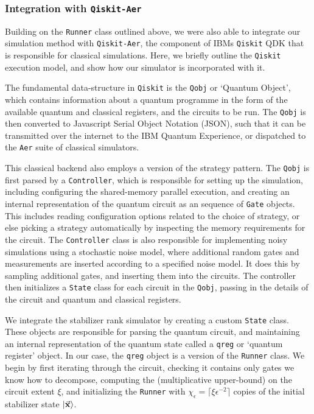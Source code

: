 \subsubsection{Integration with \texttt{Qiskit-Aer}}
Building on the \texttt{Runner} class outlined above, we were also able to integrate our simulation method with \texttt{Qiskit-Aer}, the component of IBMs \texttt{Qiskit} QDK that is responsible for classical simulations. Here, we briefly outline the \texttt{Qiskit} execution model, and show how our simulator is incorporated with it.\par
The fundamental data-structure in \texttt{Qiskit} is the \texttt{Qobj} or `Quantum Object', which contains information about a quantum programme in the form of the available quantum and classical registers, and the circuits to be run. The \texttt{Qobj} is then converted to Javascript Serial Object Notation (JSON), such that it can be transmitted over the internet to the IBM Quantum Experience, or dispatched to the \texttt{Aer} suite of classical simulators.\par 
This classical backend also employs a version of the strategy pattern. The \texttt{Qobj} is first parsed by a \texttt{Controller}, which is responsible for setting up the simulation, including configuring the shared-memory parallel execution, and creating an internal representation of the quantum circuit as an sequence of \texttt{Gate} objects. This includes reading configuration options related to the choice of strategy, or else picking a strategy automatically by inspecting the memory requirements for the circuit. The \texttt{Controller} class is also responsible for implementing noisy simulations using a stochastic noise model, where additional random gates and measurements are inserted according to a specified noise model. It does this by sampling additional gates, and inserting them into the circuits. The controller then initializes a \texttt{State} class for each circuit in the \texttt{Qobj}, passing in the details of the circuit and quantum and classical registers. \par
We integrate the stabilizer rank simulator by creating a custom \texttt{State} class. These objects are responsible for parsing the quantum circuit, and maintaining an internal representation of the quantum state called a \texttt{qreg} or `quantum register' object. In our case, the \texttt{qreg} object is a version of the \texttt{Runner} class. We begin by first iterating through the circuit, checking it contains only gates we know how to decompose, computing the (multiplicative upper-bound) on the circuit extent $\xi$, and initializing the \texttt{Runner} with $\chi_{\epsilon}=\lceil \xi \epsilon^{-2}\rceil$ copies of the initial stabilizer state $\ket{\va{x}}$.\par
